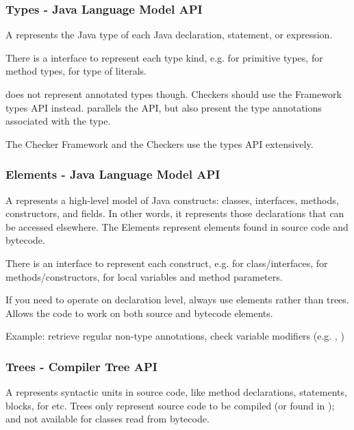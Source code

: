 \subsubsection{Types - Java Language Model API}

A  represents the Java type of each
Java declaration, statement, or expression.

There is a  interface to represent each type kind,
e.g.  for primitive types, 
for method types,  for type of  literals.

 does not represent annotated types though.  Checkers should use the Framework types API  instead.   parallels the  API, but also present the type annotations associated with the type.

The Checker Framework and the Checkers use the types API extensively.

\subsubsection{Elements - Java Language Model API}

A  represents a high-level model of
Java constructs: classes, interfaces, methods, constructors, and
fields. In other words, it represents those declarations that can be
accessed elsewhere. The Elements represent elements found in source
code and bytecode.

There is an  interface to represent each construct, e.g.
 for class/interfaces,  for
methods/constructors,  for local variables and
method parameters.

If you need to operate on declaration level, always use elements
rather than trees. Allows the code to work on both source and bytecode
elements.

Example: retrieve regular non-type annotations, check variable
modifiers (e.g. , )

\subsubsection{Trees - Compiler Tree API}

A  represents syntactic units in source code,
like method declarations, statements, blocks, for etc. Trees only
represent source code to be compiled (or found in );
and not available for classes read from bytecode.

